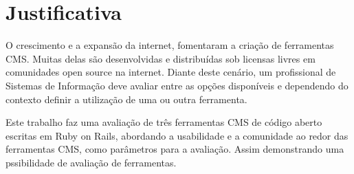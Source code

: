\section{Justificativa}
 
O crescimento e a expansão da internet, fomentaram a criação de ferramentas CMS. Muitas delas são desenvolvidas e distribuídas sob licensas livres em comunidades open source na internet. Diante deste cenário, um profissional de Sistemas de Informação deve avaliar entre as opções disponíveis e dependendo do contexto definir a utilização de uma ou outra ferramenta.

Este trabalho faz uma avaliação de três ferramentas CMS de código aberto escritas em Ruby on Rails,  abordando a usabilidade e a comunidade ao redor das ferramentas CMS, como parâmetros para a avaliação. Assim demonstrando uma pssibilidade de avaliação de ferramentas.





    

